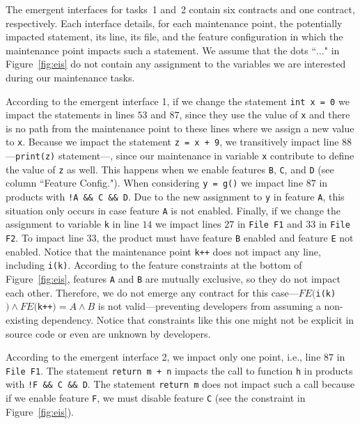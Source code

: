 The emergent interfaces for tasks~1 and~2 contain six contracts and one contract, respectively. Each interface details, for each maintenance point, the potentially impacted statement, its line, its file, and the feature configuration in which the maintenance point impacts such a statement. We assume that the dots ``$\dots$" in Figure~\ref{fig:eis} do not contain any assignment to the variables we are interested during our maintenance tasks.

According to the emergent interface 1, if we change the statement \texttt{int x = 0} we impact the statements in lines $53$ and $87$, since they use the value of \texttt{x} and there is no path from the maintenance point to these lines where we assign a new value to \texttt{x}. Because we impact the statement \texttt{z = x + 9}, we transitively impact line $88$---\texttt{print(z)} statement---, since our maintenance in variable \texttt{x} contribute to define the value of \texttt{z} as well. This happens when we enable features \texttt{B}, \texttt{C}, and \texttt{D} (see column ``Feature Config."). When considering \texttt{y = g()} we impact line $87$ in products with \texttt{!A \&\& C \&\& D}. Due to the new assignment to \texttt{y} in feature \texttt{A}, this situation only occurs in case feature \texttt{A} is not enabled. Finally, if we change the assignment to variable \texttt{k} in line $14$ we impact lines $27$ in \texttt{File F1} and $33$ in \texttt{File F2}. To impact line $33$, the product must have feature \texttt{B} enabled and feature \texttt{E} not enabled. Notice that the maintenance point \texttt{k++} does not impact any line, including \texttt{i(k)}. According to the feature constraints at the bottom of Figure~\ref{fig:eis}, features \texttt{A} and \texttt{B} are mutually exclusive, so they do not impact each other. Therefore, we do not emerge any contract for this case---$FE($\texttt{i(k)}$) \wedge FE($\texttt{k++}$) = A \wedge B$ is not valid---preventing developers from assuming a non-existing dependency. Notice that constraints like this one might not be explicit in source code or even are unknown by developers.

According to the emergent interface 2, we impact only one point, i.e., line $87$ in \texttt{File F1}. The statement \texttt{return m + n} impacts the call to function \texttt{h} in products with \texttt{!F \&\& C \&\& D}. The statement \texttt{return m} does not impact such a call because if we enable feature \texttt{F}, we must disable feature \texttt{C} (see the constraint in Figure~\ref{fig:eis}).

